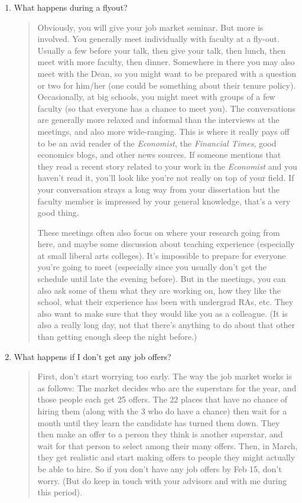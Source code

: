 \documentclass{\classes/econtex}
\begin{document}
\begin{enumerate}
\item  What happens during a flyout?
  \begin{quote}
    Obviously, you will give your job market seminar.  But more is
    involved.  You generally meet individually with faculty at a
    fly-out.  Usually a few before your talk, then give your talk, then
    lunch, then meet with more faculty, then dinner.  Somewhere in there
    you may also meet with the Dean, so you might want to be prepared
    with a question or two for him/her (one could be something about
    their tenure policy).  Occasionally, at big schools, you might meet
    with groups of a few faculty (so that everyone has a chance to meet
    you).  The conversations are generally more relaxed and informal
    than the interviews at the meetings, and also more wide-ranging.
    This is where it really pays off to be an avid reader of the \textit{Economist},
    the \textit{Financial Times}, good economics blogs, and other news sources.
    If someone mentions that they read a recent story related to your 
    work in the \textit{Economist} and you haven't read it, you'll look like
    you're not really on top of your field.  If your conversation strays
    a long way from your dissertation but the faculty member is impressed 
    by your general knowledge, that's a very good thing.

    These meetings often also focus on where your research going from
    here, and maybe some discussion about teaching experience (especially
    at small liberal arts colleges).  It's impossible to prepare for
    everyone you're going to meet (especially since you usually don't get
    the schedule until late the evening before).  But in the meetings, you
    can also ask some of them what they are working on, how they like the
    school, what their experience has been with undergrad RAs, etc.  They
    also want to make sure that they would like you as a colleague.  (It is
    also a really long day, not that there's anything to do about that other
    than getting enough sleep the night before.)



  \end{quote}

\item  {} 
  What happens if I don't get any job offers?
  \begin{quote}
    First, don't start worrying too early.  The way the job market works
    is as follows: The market decides who are the superstars for the year, and
    those people each get 25 offers.  The 22 places that have no chance of
    hiring them (along with the 3 who do have a chance) then wait for a
    month until they learn the candidate has turned them down.  They then
    make an offer to a person they think is another superstar, and wait for that person
    to select among their many offers.  Then, in March, they get
    realistic and start making offers to people they might actually be
    able to hire.  So if you don't have any job offers by Feb 15, don't
    worry.  (But do keep in touch with your advisors and with me during this
    period).


\end{quote}
\end{enumerate}
\end{document}
